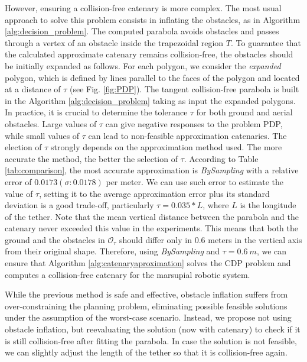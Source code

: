 However, ensuring a collision-free catenary is more complex. The most usual approach to solve this problem consists in inflating the obstacles, as in Algorithm \ref{alg:decision_problem}. The computed parabola avoids obstacles and passes through a vertex of an obstacle inside the trapezoidal region $T$. To guarantee that the calculated approximate catenary remains collision-free, the obstacles should be initially expanded as follows. For each polygon, we consider the \emph{expanded} polygon, which is defined by lines parallel to the faces of the polygon and located at a distance of $\tau$ (see Fig. \ref{fig:PDP}). The tangent collision-free parabola is built in the Algorithm \ref{alg:decision_problem} taking as input the expanded polygons. In practice, it is crucial to determine the tolerance $\tau$ for both ground and aerial obstacles. Large values of $\tau$ can give negative responses to the problem PDP, while small values of $\tau$ can lead to non-feasible approximation catenaries.  The election of $\tau$ strongly depends on the approximation method used. The more accurate the method, the better the selection of $\tau$. According to Table \ref{tab:comparison}, the most accurate approximation is \emph{BySampling} with a relative error of $0.0173(\sigma:0.0178)$ per meter. We can use such error to estimate the value of $\tau$, setting it to the average approximation error plus its standard deviation is a good trade-off, particularly $\tau=0.035*L$, where $L$ is the longitude of the tether. Note that the mean vertical distance between the parabola and the catenary never exceeded this value in the experiments. This means that both the ground and the obstacles in $\mathcal{O}_{\tau}$ should differ only in $0.6$ meters in the vertical axis from their original shape. Therefore, using \emph{BySampling} and $\tau=0.6~m$, we can ensure that Algorithm \ref{alg:catenaryaproximation} solves the CDP problem and computes a collision-free catenary for the marsupial robotic system.

While the previous method is safe and effective, obstacle inflation suffers from over-constraining the planning problem, eliminating possible feasible solutions under the assumption of the worst-case scenario. Instead, we propose not using obstacle inflation, but reevaluating the solution (now with catenary) to check if it is still collision-free after fitting the parabola. In case the solution is not feasible, we can slightly adjust the length of the tether so that it is collision-free again.


